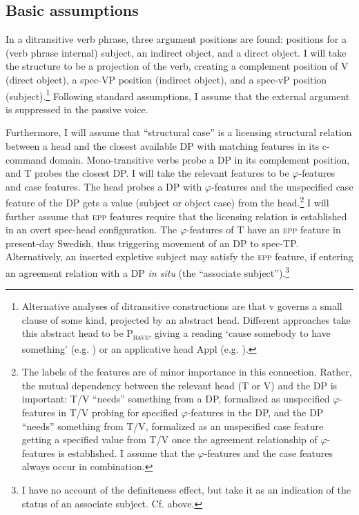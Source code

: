 \documentclass[output=paper]{langscibook}
\begin{document}
\subsection{Basic assumptions}\label{sec:falk:4.1}


In a ditransitive verb phrase, three argument positions are found: positions for a (verb phrase internal) subject, an indirect object, and a direct object. I will take the structure to be a projection of the verb, creating a complement position of V (direct object), a spec-VP position (indirect object), and a spec-vP position (subject).\footnote{Alternative analyses of ditransitive constructions are that v governs a small clause of some kind, projected by an abstract head. Different approaches take this abstract head to be P\textsc{\textsubscript{have}}, giving a reading ‘cause somebody to have something’ (e.g. \citealt{HarleyJung2015}) or an applicative head Appl (e.g. \citealt{Pylkkanen2008}).} Following standard assumptions, I assume that the external argument is suppressed in the passive voice.


Furthermore, I will assume that “structural case” is a licensing structural relation between a head and the closest available DP with matching features in its c-command domain. Mono-transitive verbs probe a DP in its complement position, and T probes the closest DP. I will take the relevant features to be $\varphi $-features and case features. The head probes a DP with $\varphi $-features and the unspecified case feature of the DP gets a value (subject or object case) from the head.\footnote{The labels of the features are of minor importance in this connection. Rather, the mutual dependency between the relevant head (T or V) and the DP is important: T/V “needs” something from a DP, formalized as unspecified $\varphi ${}-features in T/V probing for specified $\varphi ${}-features in the DP, and the DP “needs” something from T/V, formalized as an unspecified case feature getting a specified value from T/V once the agreement relationship of $\varphi ${}-features is established. I assume that the $\varphi ${}-features and the case features always occur in combination.} I will further assume that \textsc{epp} features require that the licensing relation is established in an overt spec-head configuration. The $\varphi $-features of T have an \textsc{epp} feature in present-day Swedish, thus triggering movement of an DP to spec-TP. Alternatively, an inserted expletive subject may satisfy the \textsc{epp} feature, if entering an agreement relation with a DP \textit{in situ} (the “associate subject”).\footnote{I have no account of the definiteness effect, but take it as an indication of the status of an associate subject. Cf.  above.}
\end{document}
